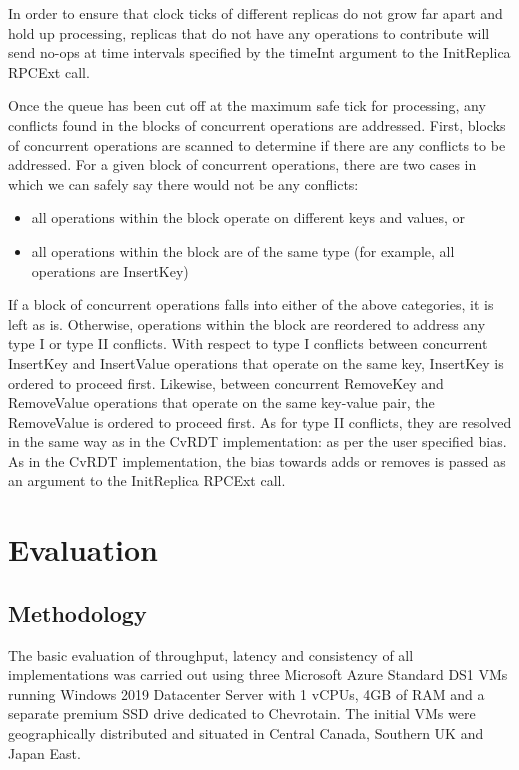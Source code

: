 \documentclass[sigconf,nonacm,11pt]{acmart}
\begin{document}
In order to ensure that clock ticks of different replicas do not grow far apart and hold up processing, replicas that do not have any operations to contribute will send no-ops at time intervals specified by the timeInt argument to the InitReplica RPCExt call.

Once the queue has been cut off at the maximum safe tick for processing, any conflicts found in the blocks of concurrent operations are addressed. First, blocks of concurrent operations are scanned to determine if there are any conflicts to be addressed. For a given block of concurrent operations, there are two cases in which we can safely say there would not be any conflicts:
\begin{itemize}
 \item all operations within the block operate on different keys and values, or
 \item all operations within the block are of the same type (for example, all operations are InsertKey)
\end{itemize}

If a block of concurrent operations falls into either of the above categories, it is left as is. Otherwise, operations within the block are reordered to address any type I or type II conflicts. With respect to type I conflicts between concurrent InsertKey and InsertValue operations that operate on the same key, InsertKey is ordered to proceed first. Likewise, between concurrent RemoveKey and RemoveValue operations that operate on the same key-value pair, the RemoveValue is ordered to proceed first. As for type II conflicts, they are resolved in the same way as in the CvRDT implementation: as per the user specified bias. As in the CvRDT implementation, the bias towards adds or removes is passed as an argument to the InitReplica RPCExt call.

\section{Evaluation}
\subsection{Methodology}
The basic evaluation of throughput, latency and consistency of all implementations was carried out using three Microsoft Azure Standard DS1 VMs running Windows 2019 Datacenter Server with 1 vCPUs, 4GB of RAM and a separate premium SSD drive dedicated to Chevrotain. The initial VMs were geographically distributed and situated in Central Canada, Southern UK and Japan East.
\end{document}
